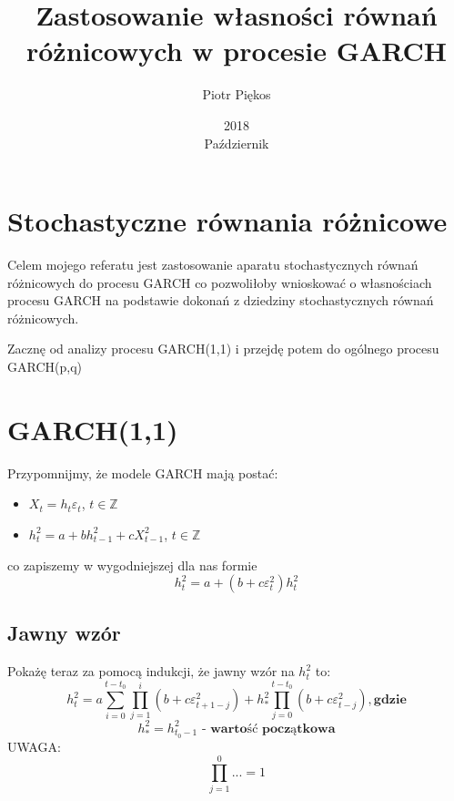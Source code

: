 \documentclass[12pt]{article}
\title{Zastosowanie własności równań różnicowych w procesie GARCH}
\date{2018\\ Październik}
\author{Piotr Piękos}
\begin{document}
\maketitle

\section{Stochastyczne równania różnicowe}

Celem mojego referatu jest zastosowanie aparatu stochastycznych równań różnicowych do procesu GARCH co pozwoliłoby wnioskować o własnościach procesu GARCH na podstawie dokonań z dziedziny stochastycznych równań różnicowych.

Zacznę od analizy procesu GARCH(1,1) i przejdę potem do ogólnego procesu GARCH(p,q)

\newpage
\section{GARCH(1,1)}

Przypomnijmy, że modele GARCH mają postać:
\begin{itemize}
\item $X_t = h_t \varepsilon_t$, $t \in \mathbb{Z}$
\item $h_t^2 = a + bh_{t-1}^2 + cX_{t-1}^2$, $t \in \mathbb{Z}$
\end{itemize}

co zapiszemy w wygodniejszej dla nas formie
\[
    h_t^2 = a + (b+c\varepsilon_t^2)h_t^2
    \]
    
\subsection{Jawny wzór}

Pokażę teraz za pomocą indukcji, że jawny wzór na $h_t^2$ to:
\[
h_t^2 = a\sum_{i=0}^{t-t_0}\prod_{j=1}^i(b+c\varepsilon_{t+1-j}^2) + h_*^2\prod_{j=0}^{t-t_0}(b+c\varepsilon_{t-j}^2), \textbf{gdzie}
\]\[
h_*^2 = h_{t_0 - 1}^2 \textbf{ - wartość początkowa}
\]
UWAGA:\[
\prod_{j=1}^0 ... = 1
\]
\end{document}
